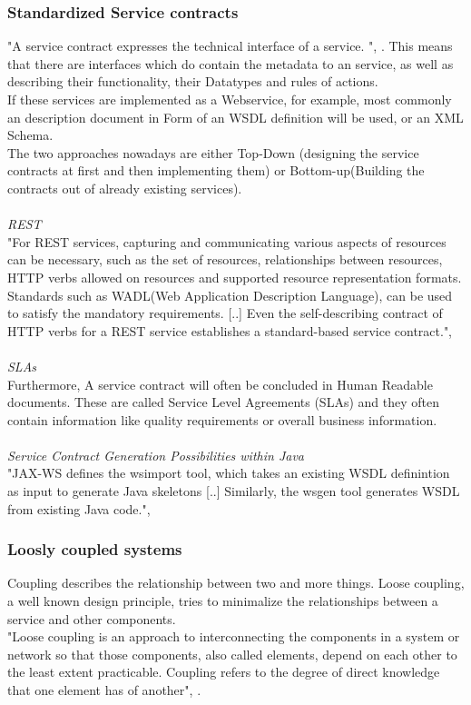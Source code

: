 \documentclass[12pt]{article}
\begin{document}
\subsubsection{Standardized Service contracts}
\label{sec:StandardizedServicecontracts}
"A service contract expresses the technical interface of a service. ", \cite[page 33]{grau}. This means that there are interfaces which do contain the metadata to an service, as well as describing their functionality, their Datatypes and rules of actions. \cite[page 86]{te} \\ If these services are implemented as a Webservice, for example, most commonly an description document in Form of an WSDL definition will be used, or an XML Schema. \\
The two approaches nowadays are either Top-Down (designing the service contracts at first and then implementing them) or Bottom-up(Building the contracts out of already existing services). \cite[page 151,152]{grau}
\\ \\
\textit{REST}\\
"For REST services, capturing and communicating various aspects of resources can be necessary, such as the set of resources, relationships between resources, HTTP verbs allowed on resources and supported resource representation formats. Standards such as WADL(Web Application Description Language), can be used to satisfy the mandatory requirements. [..] Even the self-describing contract of HTTP verbs for a REST service establishes a standard-based service contract.", \cite[page 151]{grau}
\\ \\
\textit{SLAs} \\
Furthermore, A service contract will often be concluded in Human Readable documents. These are called Service Level Agreements (SLAs) and they often contain information like quality requirements or overall business information. %
\\ \\
\textit{Service Contract Generation Possibilities within Java} \\
"JAX-WS defines the wsimport tool, which takes an existing WSDL definintion as input to generate Java skeletons [..] Similarly, the wsgen tool generates WSDL from existing Java code.",\cite[page 151]{grau}
\\
\subsubsection{Loosly coupled systems}
Coupling describes the relationship between two and more things. Loose coupling, a well known design principle,  tries to minimalize the relationships between a service and other components. \cite[page 87]{te} \\
"Loose coupling is an approach to interconnecting the components in a system or network so that those components, also called elements, depend on each other to the least extent practicable. Coupling refers to the degree of direct knowledge that one element has of another", \cite{loosecoupldef}.
\end{document}

